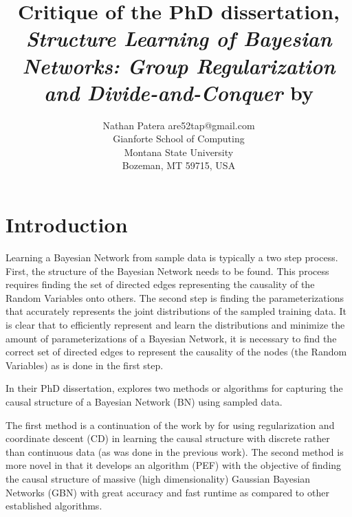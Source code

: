 \documentclass[twoside,11pt]{article}
\begin{document}
\title{Critique of the PhD dissertation, \textit{Structure Learning of Bayesian Networks: Group Regularization and Divide-and-Conquer} by \citep{jiaying}}

\author{\name Nathan Patera \email are52tap@gmail.com \\
       \addr Gianforte School of Computing\\
       Montana State University\\
       Bozeman, MT 59715, USA
       }


\maketitle

\section{Introduction}

Learning a Bayesian Network from sample data is typically a two step process. First, the structure of the Bayesian Network needs to be found. This process requires finding the set of directed edges representing the causality of the Random Variables onto others. The second step is finding the parameterizations that accurately represents the joint distributions of the sampled training data. It is clear that to efficiently represent and learn the distributions and minimize the amount of parameterizations of a Bayesian Network, it is necessary to find the correct set of directed edges to represent the causality of the nodes (the Random Variables) as is done in the first step. %

In their PhD dissertation, \cite{jiaying} explores two methods or algorithms for capturing the causal structure of a Bayesian Network (BN) using sampled data. 

The first method is a continuation of the work by \cite{zhou} for using regularization and coordinate descent (CD) in learning the causal structure with discrete rather than continuous data (as was done in the previous work). The second method is more novel in that it develops an algorithm (PEF) with the objective of finding the causal structure of massive (high dimensionality) Gaussian Bayesian Networks (GBN) with great accuracy and fast runtime as compared to other established algorithms.
\end{document}
